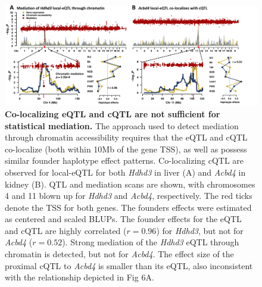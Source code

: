 \documentclass[10pt,letterpaper,twoside]{article}
\begin{document}
\clearpage

\begin{figure}[hp]
\renewcommand{\familydefault}{\sfdefault}\normalfont
\centering
\includegraphics[width=\textwidth]{figs/mediation_or_colocal.png}
\caption{\textbf{Co-localizing eQTL and cQTL are not sufficient for statistical mediation.} 
The approach used to detect mediation through chromatin accessibility requires that the eQTL and cQTL co-localize (both within 10Mb of the gene TSS), as well as possess similar founder haplotype effect patterns. Co-localizing cQTL are observed for local-eQTL for both \textit{Hdhd3} in liver (A) and \textit{Acbd4} in kidney (B). QTL and mediation scans are shown, with chromosomes 4 and 11 blown up for \textit{Hdhd3} and \textit{Acbd4}, respectively. The red ticks denote the TSS for both genes. The founders effects were estimated as centered and scaled BLUPs. The founder effects for the eQTL and cQTL are highly correlated ($r = 0.96$) for \textit{Hdhd3}, but not for \textit{Acbd4} ($r = 0.52$). Strong mediation of the \textit{Hdhd3} eQTL through chromatin is detected, but not for \textit{Acbd4}. The effect size of the proximal cQTL to \textit{Acbd4} is smaller than its eQTL, also inconsistent with the relationship depicted in Fig 6A.
\label{fig:colocalization}}
\end{figure}

\clearpage
\end{document}
